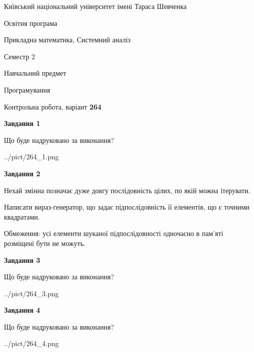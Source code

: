 \documentclass[12pt, ukrainian]{article}
\begin{document}
{{\begin {small}\par
{ \center  Київський національний університет імені Тараса Шевченка \par}
{\parbox {5 cm}{Освітня програма \hfill}{\parbox {8 cm}{Прикладна математика, Системний аналіз \hfill}}\parbox {5 cm}{\hfill Семестр 2}}\par
{\parbox {5 cm} {Навчальний предмет \hfill}\parbox {7 cm}{Програмування \hfill}\parbox {6cm}{\hfill}\par}\vspace{-7pt} \end{small}}{\center Контрольна робота, варіант  \No \textbf
{ 264 }\par}}
{
\begin {large}
{\begin {center}\textbf{Завдання 1}\end {center}}\par
Що буде надруковано за виконання?\par\par
\begin{center}
	{../pict/264_1.png}
\end{center}
\newpage

{\begin {center}\textbf{Завдання 2}\end {center}}\par
Нехай змінна  позначає дуже довгу послідовність цілих, по якій можна ітерувати.

Написати вираз-генератор, що задає підпослідовність її елементів, що є точними квадратами.

Обмеження: усі елементи шуканої підпослідовності одночасно в пам'яті розміщені бути не можуть.\par
\newpage

{\begin {center}\textbf{Завдання 3}\end {center}}\par
Що буде надруковано за виконання?\par
\begin{center}
	{../pict/264_3.png}
\end{center}
\newpage

{\begin {center}\textbf{Завдання 4}\end {center}}\par
Що буде надруковано за виконання?\par
\begin{center}
	{../pict/264_4.png}
\end{center}
\newpage


\end{large}}
\end{document}
